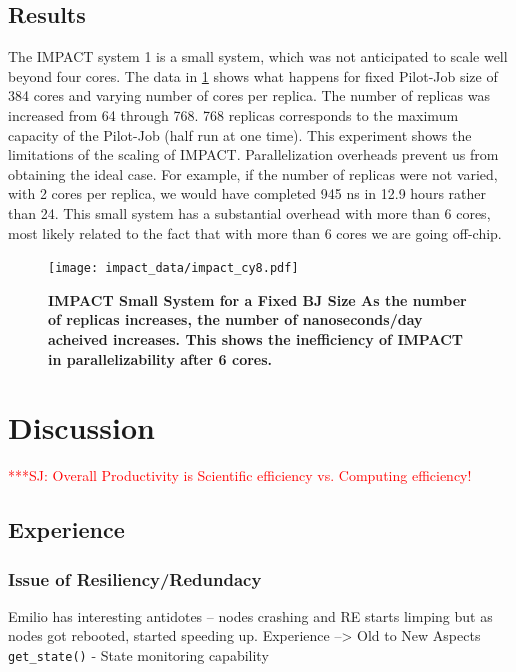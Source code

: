 \documentclass{sig-alternate}
\newcommand{\jhanote}[1]{ {\textcolor{red} { ***SJ: #1 }}}
\newcommand{\jhanote}[1]{}
\begin{document}

\subsection{Results}

The IMPACT system 1 is a small system, which was not anticipated to scale well beyond four cores. The data in \ref{fig:impact_cy8} shows what happens for fixed Pilot-Job size of 384 cores and varying number of cores per replica. The number of replicas was increased from 64 through 768. 768 replicas corresponds to the maximum capacity of the Pilot-Job (half run at one time). This experiment shows the limitations of the scaling of IMPACT. Parallelization overheads prevent us from obtaining the ideal case. For example, if the number of replicas were not varied, with 2 cores per replica, we would have completed 945 ns in 12.9 hours rather than 24. This small system has a substantial overhead with more than 6 cores, most likely related to the fact that with more than 6 cores we are going off-chip. 

\begin{figure}[t]
	\centering
		\texttt{[image: impact\_data/impact\_cy8.pdf]}
	\caption{\textbf{IMPACT Small System for a Fixed BJ Size As the number of replicas  
                      increases, the number of nanoseconds/day acheived increases. This shows the inefficiency of IMPACT in parallelizability after 6 cores.}}
	\label{fig:impact_cy8}
\end{figure}


\section{Discussion}

\jhanote{Overall Productivity is Scientific efficiency vs. Computing
  efficiency!}

\subsection{Experience}

\subsubsection{Issue of Resiliency/Redundacy} Emilio has interesting
antidotes -- nodes crashing and RE starts limping but as nodes got
rebooted, started speeding up.  Experience --> Old to New Aspects
\texttt{get\_state()} - State monitoring capability
\end{document}
